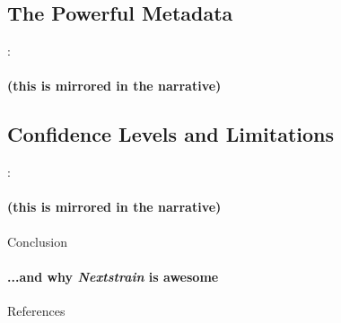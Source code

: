 \documentclass{beamer}
\begin{document}
\begin{darkframes}
    \subsection{The Powerful Metadata}
    \begin{frame}{\secname : \subsecname}
      \framesubtitle{(this is mirrored in the narrative)}
    \end{frame}

    \subsection{Confidence Levels and Limitations}
    \begin{frame}{\secname : \subsecname}
      \framesubtitle{(this is mirrored in the narrative)}
    \end{frame}

    \begin{frame}{Conclusion}
      \framesubtitle{...and why \textit{Nextstrain} is awesome}
    \end{frame}

    \begin{frame}[allowframebreaks]{References}
    \tiny


    \end{frame}




  \end{darkframes}
\end{document}
